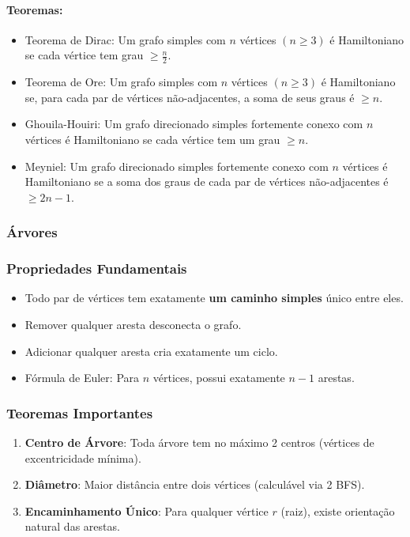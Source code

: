 \paragraph{Teoremas:} \empty
\begin{itemize}
    \item Teorema de Dirac: Um grafo simples com $n$ vértices $(n\ge 3)$ é Hamiltoniano se cada vértice tem grau $ \ge \frac{n}{2}$.
    \item Teorema de Ore: Um grafo simples com $n$ vértices $(n\ge 3)$ é Hamiltoniano se, para cada par de vértices não-adjacentes, a soma de seus graus é $\ge n$.
    \item Ghouila-Houiri: Um grafo direcionado simples fortemente conexo com $n$ vértices é Hamiltoniano se cada vértice tem um grau $\ge n$.
    \item Meyniel: Um grafo direcionado simples fortemente conexo com $n$ vértices é Hamiltoniano se a soma dos graus de cada par de vértices não-adjacentes é $\ge 2n-1$.
\end{itemize}

\subsubsection{Árvores}
\subsubsection*{Propriedades Fundamentais}
\begin{itemize}
    \item Todo par de vértices tem exatamente \textbf{um caminho simples} único entre eles.
    \item Remover qualquer aresta desconecta o grafo.
    \item Adicionar qualquer aresta cria exatamente um ciclo.
    \item Fórmula de Euler: Para $n$ vértices, possui exatamente $n-1$ arestas.
\end{itemize}

\subsubsection*{Teoremas Importantes}
\begin{enumerate}
    \item \textbf{Centro de Árvore}: Toda árvore tem no máximo 2 centros (vértices de excentricidade mínima).
    \item \textbf{Diâmetro}: Maior distância entre dois vértices (calculável via 2 BFS).
    \item \textbf{Encaminhamento Único}: Para qualquer vértice $r$ (raiz), existe orientação natural das arestas.
\end{enumerate}

